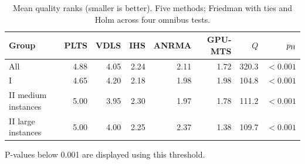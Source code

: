 \begin{table}[tbp]\centering\small
\caption{Mean quality ranks (smaller is better). Five methods; Friedman with ties and Holm across four omnibus tests.}
\label{tab:friedman}
\begin{tabular}{lrrrrrrr}
\toprule
Group & PLTS & VDLS & IHS & ANRMA & GPU-MTS & $Q$ & $p_{\rm H}$\\
\midrule
All & 4.88 & 4.05 & 2.24 & 2.11 & 1.72 & 320.3 & $<0.001$\\
I & 4.65 & 4.20 & 2.18 & 1.98 & 1.98 & 104.8 & $<0.001$\\
II medium instances & 5.00 & 3.95 & 2.30 & 1.97 & 1.78 & 111.2 & $<0.001$\\
II large instances & 5.00 & 4.00 & 2.25 & 2.37 & 1.38 & 109.7 & $<0.001$\\
\bottomrule\end{tabular}
\par\smallskip\parbox{.97\linewidth}{\footnotesize P-values below 0.001 are displayed using this threshold.}
\end{table}
